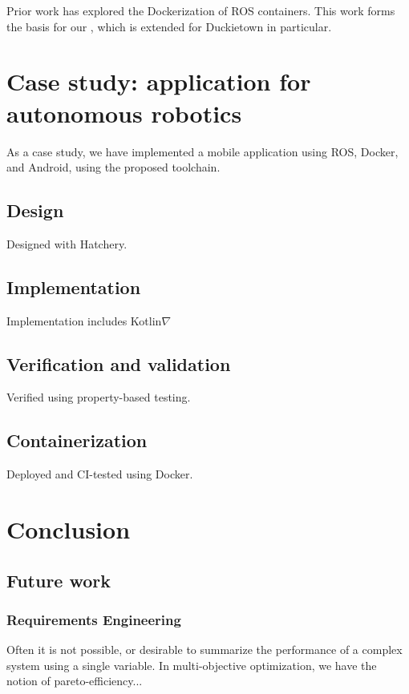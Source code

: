 \documentclass[12pt,initial,twoside,maitrise]{dms}
\numberwithin{equation}{section}
\numberwithin{table}{chapter}
\numberwithin{figure}{chapter}
\begin{document}
Prior work has explored the Dockerization of ROS containers\cite{white2017ros-docker}. This work forms the basis for our , which is extended for Duckietown in particular.

\chapter{Case study: application for autonomous robotics}

As a case study, we have implemented a mobile application using ROS, Docker, and Android, using the proposed toolchain.

\section{Design}

Designed with Hatchery.

\section{Implementation}

Implementation includes Kotlin$\nabla$

\section{Verification and validation}

Verified using property-based testing.

\section{Containerization}

Deployed and CI-tested using Docker.

\chapter{Conclusion}\label{ch:conclusion}

\section{Future work}

\subsection{Requirements Engineering}

Often it is not possible, or desirable to summarize the performance of a complex system using a single variable. In multi-objective optimization, we have the notion of pareto-efficiency...
\end{document}
